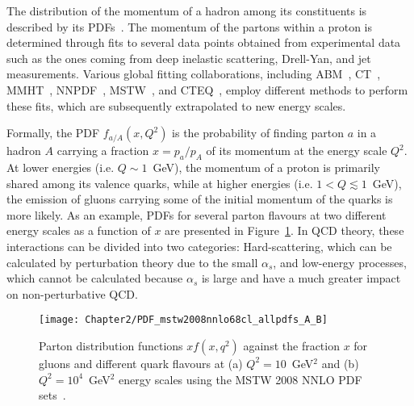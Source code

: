 
The distribution of the momentum of a hadron among its constituents is described by its
PDFs~\cite{Butterworth:2015oua}. The momentum of the partons within a proton is 
determined through fits to several data points obtained from experimental data 
such as the ones coming from deep inelastic scattering, Drell-Yan, and jet measurements. Various global fitting 
collaborations, including ABM~\cite{Alekhin:2013nda}, CT~\cite{Dulat:2015mca}, 
MMHT~\cite{Harland-Lang:2014zoa}, NNPDF~\cite{NNPDF:2014otw}, MSTW~\cite{Watt:2012tq}, and CTEQ~\cite{Hou:2019efy}, employ different 
methods to perform these fits, which are subsequently extrapolated to new energy scales.

Formally, the PDF $f_{a/A}(x, Q^{2})$ is the probability of finding parton $a$ in a hadron $A$ 
carrying a fraction $x=p_{a}/p_{A}$ of its momentum at the energy scale $Q^2$. 
At lower energies (i.e. $Q\sim1$~GeV), the momentum of a proton is primarily shared 
among its valence quarks, while at higher energies (i.e. $1 <Q \lesssim 1$~GeV), 
the emission of gluons carrying some of the initial momentum of the quarks is more likely.
As an example, PDFs for several parton flavours at two different energy scales as a function of $x$ 
are presented in Figure~\ref{fig:Chap2:NNLO_PDF}.
In QCD theory, these interactions can be divided into two categories: 
Hard-scattering, which can be calculated by perturbation theory due to the small $\alpha_{s}$, and 
low-energy processes, which cannot be calculated because $\alpha_{s}$ is large and 
have a much greater impact on non-perturbative QCD. 

\begin{figure}[h]
 	  \centering
	\texttt{[image: Chapter2/PDF\_mstw2008nnlo68cl\_allpdfs\_A\_B]}
	\caption{Parton distribution functions $xf(x,q^{2})$ against the fraction $x$ 
		      for gluons and different quark flavours 
		      at (a) $Q^{2}=10$~GeV$^2$ and (b) $Q^{2}=10^{4}$~GeV$^2$ energy scales using the MSTW 
		      2008 NNLO PDF sets~\cite{Martin:2009iq}.}
	\label{fig:Chap2:NNLO_PDF}
\end{figure} 


